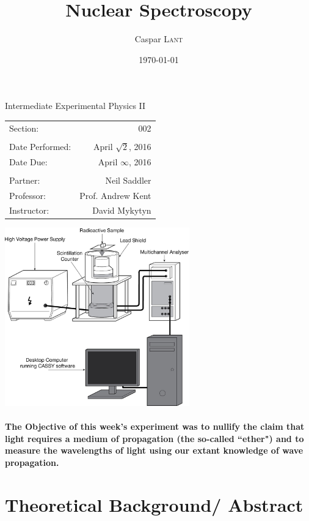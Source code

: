 \documentclass{amsart}
\title{Nuclear Spectroscopy}
\author{Caspar \textsc{Lant}} %
\date{\today} %
\begin{document}
\bigskip

\maketitle %
\begin{center}
    Intermediate Experimental Physics II\\
    \vspace{.7cm}
    \begin{tabular}{l r}
        Section: & 002\\
        \\
        Date Performed: & April $\sqrt{2}$, 2016 \\ %
        Date Due: & April $\infty$, 2016\\
        \\
        Partner: & Neil Saddler\\ %
        Professor: & Prof. Andrew Kent\\
        Instructor: & David Mykytyn %
    \end{tabular}
    \vfill
    \includegraphics[width=0.6\textwidth]{diagram.jpg}
    \vfill
\end{center}

\pagebreak
{}
\paragraph{\textbf{The Objective} of this week's experiment was to nullify the claim that light requires a medium of propagation (the so-called ``ether") and to measure the wavelengths of light using our extant knowledge of wave propagation.}

\section{Theoretical Background/ Abstract}
\end{document}
